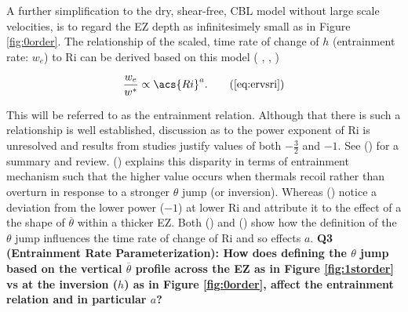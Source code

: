 A further simplification to the dry, shear-free, \acs{CBL} model without large scale velocities, is to regard the \acs{EZ} depth as infinitesimely small as in Figure \ref{fig:0order}.  The relationship of the scaled, time rate of change of $h$ (entrainment rate: $w_{e}$) to \acs{Ri} can be derived based on this model (\citeauthor{Tennekes73} \citeyear{Tennekes73}, \citeauthor{Deardorff79} \citeyear{Deardorff79}, \citeauthor{FedConzMir04} \citeyear{FedConzMir04})

\begin{equation}
\frac{w_{e}}{w^{*}} \propto  \acs{Ri}^{a}.\tag{\ref{eq:ervsri}} 
\end{equation}
 
This will be referred to as the entrainment relation.  Although that there is such a relationship is well established, discussion as to the power exponent of \acs{Ri} is unresolved and results from studies justify values of both $-\frac{3}{2}$ and $-1$. See \citeauthor{Traum11} (\citeyear{Traum11}) for a summary and review.  \citeauthor{Turner86} (\citeyear{Turner86}) explains this disparity in terms of entrainment mechanism such that the higher value occurs when thermals recoil rather than overturn in response to a stronger $\theta$ jump (or inversion).  Whereas \citeauthor{SullMoengStev} (\citeyear{SullMoengStev}) notice a deviation from the lower power ($-1$) at lower \acs{Ri} and attribute it to the effect of a the shape of $\overline{\theta}$ within a thicker \acs{EZ}.  Both \citeauthor{FedConzMir04} (\citeyear{FedConzMir04}) and \citeauthor{GarciaMellado} (\citeyear{GarciaMellado}) show how the definition of the $\theta$ jump influences the time rate  of change of \acs{Ri} and so effects $a$. \textbf{Q3 (Entrainment Rate Parameterization): How does defining the $\theta$ jump based on the vertical $\overline{\theta}$ profile across the \acs{EZ} as in Figure \ref{fig:1storder} vs at the inversion ($h$) as in Figure \ref{fig:0order}, affect the entrainment relation and in particular $a$?}\\

\endinput

Any text after an \endinput is ignored.
You could put scraps here or things in progress.


